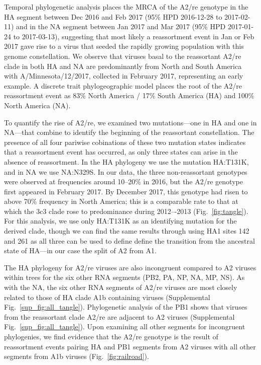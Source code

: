 Temporal phylogenetic analysis places the MRCA of the A2/re genotype in the HA segment between Dec 2016 and Feb 2017 (95\% HPD 2016-12-28 to 2017-02-11) and in the NA segment between Jan 2017 and Mar 2017 (95\% HPD 2017-01-24 to 2017-03-13), suggesting that most likely a reassortment event in Jan or Feb 2017 gave rise to a virus that seeded the rapidly growing population with this genome constellation.
We observe that viruses basal to the reassortant A2/re clade in both HA and NA are predominantly from North and South America with A/Minnesota/12/2017, collected in February 2017, representing an early example.
A discrete trait phylogeographic model places the root of the A2/re reassortment event as 83\% North America / 17\% South America (HA) and 100\% North America (NA).

To quantify the rise of A2/re, we examined two mutations---one in HA and one in NA---that combine to identify the beginning of the reassortant constellation.
The presence of all four pariwise cobinations of these two mutation states indicates that a reassortment event has occurred, as only three states can arise in the absence of reassortment.
In the HA phylogeny we use the mutation HA:T131K, and in NA we use NA:N329S.
In our data, the three non-reassortant genotypes were observed at frequencies around 10--20\% in 2016, but the A2/re genotype first appeared in February 2017.
By December 2017, this genotype had risen to above 70\% frequency in North America; this is a comparable rate to that at which the 3c3 clade rose to predominance during 2012–-2013 (Fig.~\ref{fig:tangle}).
For this analysis, we use only HA:T131K as an identifying mutation for the derived clade, though we can find the same results through using HA1 sites 142 and 261 as all three can be used to define define the transition from the ancestral state of HA---in our case the split of A2 from A1.

The HA phylogeny for A2/re viruses are also incongruent compared to A2 viruses within trees for the six other RNA segments (PB2, PA, NP, NA, MP, NS).
As with the NA, the six other RNA segments of A2/re viruses are most closely related to those of HA clade A1b containing viruses (Supplemental Fig.~\ref{sup_fig:all_tangle}).
Phylogenetic analysis of the PB1 shows that viruses from the reassortant clade A2/re are adjacent to A2 viruses (Supplemental Fig.~\ref{sup_fig:all_tangle}).
Upon examining all other segments for incongruent phylogenies, we find evidence that the A2/re genotype is the result of reassortment events pairing HA and PB1 segments from A2 viruses with all other segments from A1b viruses (Fig.~\ref{fig:railroad}).

